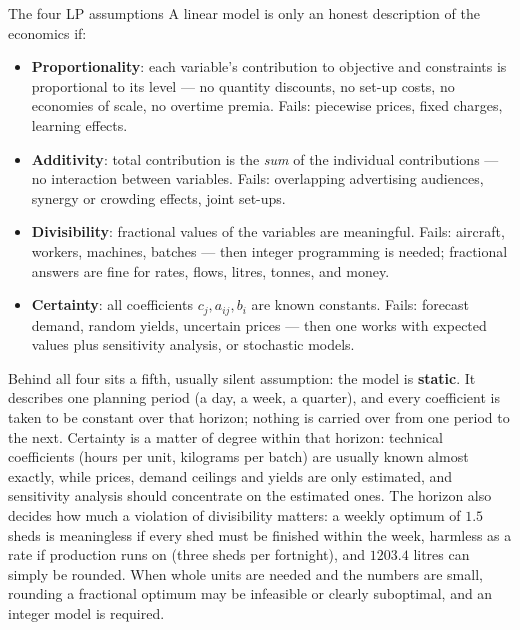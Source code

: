 \begin{rulebox}{The four LP assumptions}
A linear model is only an honest description of the economics if:
\begin{itemize}[leftmargin=1.6em,itemsep=0.3ex]
  \item \textbf{Proportionality}: each variable's
        contribution to objective and constraints is proportional to its
        level — no quantity discounts, no set-up costs, no economies of
        scale, no overtime premia. Fails: piecewise prices, fixed charges,
        learning effects.
  \item \textbf{Additivity}: total contribution is the
        \emph{sum} of the individual contributions — no interaction between
        variables. Fails: overlapping advertising audiences, synergy or
        crowding effects, joint set-ups.
  \item \textbf{Divisibility}: fractional values of the
        variables are meaningful. Fails: aircraft, workers, machines,
        batches — then integer programming is needed; fractional answers
        are fine for rates, flows, litres, tonnes, and money.
  \item \textbf{Certainty}: all coefficients
        $c_j,a_{ij},b_i$ are known constants. Fails: forecast demand,
        random yields, uncertain prices — then one works with expected
        values plus sensitivity analysis, or stochastic models.
\end{itemize}
Behind all four sits a fifth, usually silent assumption: the model is
\textbf{static}. It describes one planning period (a day, a week, a
quarter), and every coefficient is taken to be constant over that horizon;
nothing is carried over from one period to the next. Certainty is a matter
of degree within that horizon: technical coefficients (hours per unit,
kilograms per batch) are usually known almost exactly, while prices,
demand ceilings and yields are only estimated, and sensitivity analysis
should concentrate on the estimated ones. The horizon also decides how much
a violation of divisibility matters: a weekly optimum of $1.5$ sheds is
meaningless if every shed must be finished within the week, harmless as a
rate if production runs on (three sheds per fortnight), and $1203.4$ litres
can simply be rounded. When whole units are needed and the numbers are
small, rounding a fractional optimum may be infeasible or clearly
suboptimal, and an integer model is required.
\end{rulebox}


